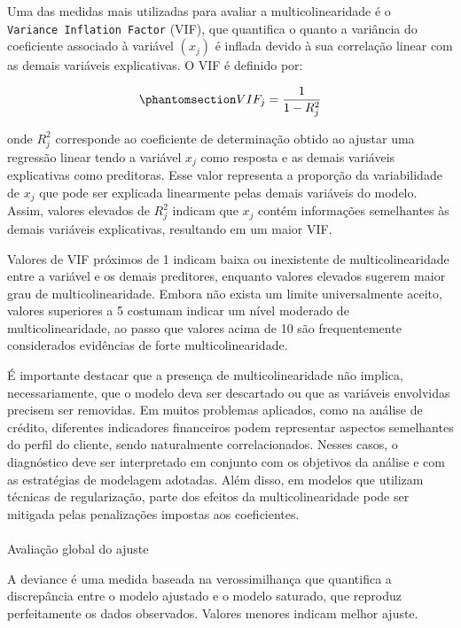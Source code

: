 \documentclass[
  brazilian,
  12pt,
  letterpaper,
  DIV=11,
  numbers=noendperiod]{scrartcl}
\makeatletter
\let\oldparagraph\paragraph
\renewcommand{\paragraph}{
    \@ifstar
      \xxxParagraphStar
      \xxxParagraphNoStar
  }
\newcommand{\xxxParagraphStar}[1]{\oldparagraph*{#1}\mbox{}}
\newcommand{\xxxParagraphNoStar}[1]{\oldparagraph{#1}\mbox{}}
\makeatother
\begin{document}
Uma das medidas mais utilizadas para avaliar a multicolinearidade é o
\texttt{Variance\ Inflation\ Factor} (VIF), que quantifica o quanto a
variância do coeficiente associado à variável \((x_j)\) é inflada devido
à sua correlação linear com as demais variáveis explicativas. O VIF é
definido por:

\begin{equation}\protect\phantomsection\label{eq-vif}{
VIF_j=
\frac{1}{1-R_j^2}
}\end{equation}

onde \(R_j^2\) corresponde ao coeficiente de determinação obtido ao
ajustar uma regressão linear tendo a variável \(x_j\) como resposta e as
demais variáveis explicativas como preditoras. Esse valor representa a
proporção da variabilidade de \(x_j\) que pode ser explicada linearmente
pelas demais variáveis do modelo. Assim, valores elevados de \(R_j^2\)
indicam que \(x_j\) contém informações semelhantes às demais variáveis
explicativas, resultando em um maior VIF.

Valores de VIF próximos de 1 indicam baixa ou inexistente de
multicolinearidade entre a variável e os demais preditores, enquanto
valores elevados sugerem maior grau de multicolinearidade. Embora não
exista um limite universalmente aceito, valores superiores a 5 costumam
indicar um nível moderado de multicolinearidade, ao passo que valores
acima de 10 são frequentemente considerados evidências de forte
multicolinearidade.

É importante destacar que a presença de multicolinearidade não implica,
necessariamente, que o modelo deva ser descartado ou que as variáveis
envolvidas precisem ser removidas. Em muitos problemas aplicados, como
na análise de crédito, diferentes indicadores financeiros podem
representar aspectos semelhantes do perfil do cliente, sendo
naturalmente correlacionados. Nesses casos, o diagnóstico deve ser
interpretado em conjunto com os objetivos da análise e com as
estratégias de modelagem adotadas. Além disso, em modelos que utilizam
técnicas de regularização, parte dos efeitos da multicolinearidade pode
ser mitigada pelas penalizações impostas aos coeficientes.

\paragraph{Avaliação global do
ajuste}\label{avaliauxe7uxe3o-global-do-ajuste}

A deviance é uma medida baseada na verossimilhança que quantifica a
discrepância entre o modelo ajustado e o modelo saturado, que reproduz
perfeitamente os dados observados. Valores menores indicam melhor
ajuste.
\end{document}
